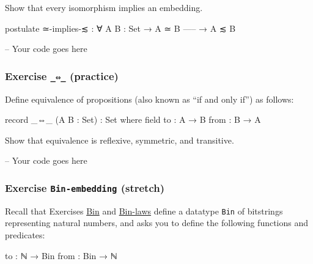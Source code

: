 Show that every isomorphism implies an embedding.

\begin{fence}
\begin{code}
postulate
  ≃-implies-≲ : ∀ {A B : Set}
    → A ≃ B
      -----
    → A ≲ B
\end{code}
\end{fence}

\begin{fence}
\begin{code}
-- Your code goes here
\end{code}
\end{fence}

\hypertarget{Isomorphism-iff}{%
\subsubsection{\texorpdfstring{Exercise \texttt{\_⇔\_}
(practice)}{Exercise \_⇔\_ (practice)}}\label{Isomorphism-iff}}

Define equivalence of propositions (also known as ``if and only if'') as
follows:

\begin{fence}
\begin{code}
record _⇔_ (A B : Set) : Set where
  field
    to   : A → B
    from : B → A
\end{code}
\end{fence}

Show that equivalence is reflexive, symmetric, and transitive.

\begin{fence}
\begin{code}
-- Your code goes here
\end{code}
\end{fence}

\hypertarget{Isomorphism-Bin-embedding}{%
\subsubsection{\texorpdfstring{Exercise \texttt{Bin-embedding}
(stretch)}{Exercise Bin-embedding (stretch)}}\label{Isomorphism-Bin-embedding}}

Recall that Exercises \protect\hyperlink{Naturals-Bin}{Bin} and
\protect\hyperlink{Induction-Bin-laws}{Bin-laws} define a datatype
\texttt{Bin} of bitstrings representing natural numbers, and asks you to
define the following functions and predicates:

\begin{myDisplay}
to : ℕ → Bin
from : Bin → ℕ
\end{myDisplay}

